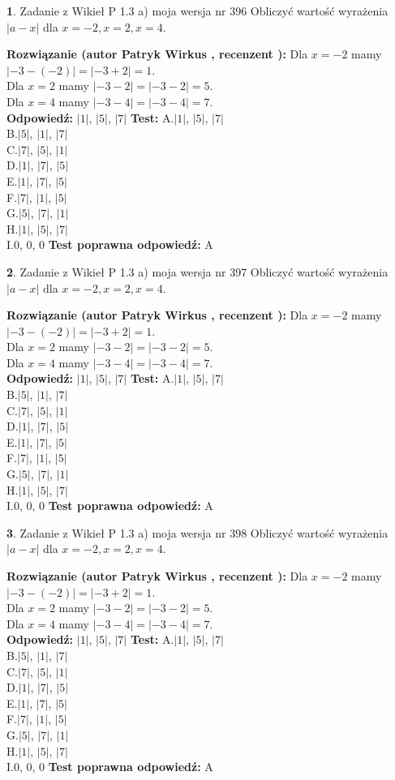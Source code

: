 \documentclass[12pt, a4paper]{article}
\theoremstyle{definition} %
\newtheorem{zad}{}
\newcommand{\zadStart}[1]{\begin{zad}#1\newline}
\newcommand{\zadStop}{\end{zad}}
\newcommand{\rozwStart}[2]{\noindent \textbf{Rozwiązanie (autor #1 , recenzent #2): }\newline}
\newcommand{\rozwStop}{\newline}
\newcommand{\odpStart}{\noindent \textbf{Odpowiedź:}\newline}
\newcommand{\odpStop}{\newline}
\newcommand{\testStart}{\noindent \textbf{Test:}\newline}
\newcommand{\testStop}{\newline}
\newcommand{\kluczStart}{\noindent \textbf{Test poprawna odpowiedź:}\newline}
\newcommand{\kluczStop}{\newline}
\begin{document}
\zadStart{Zadanie z Wikieł P 1.3 a) moja wersja nr 396}
Obliczyć wartość wyrażenia $|a - x|$ dla $x=-2,x=2,x=4$.
\zadStop
\rozwStart{Patryk Wirkus}{}
Dla $x = -2$ mamy $|-3 - (-2)| = |-3 + 2| = 1$.\\
Dla $x = 2$ mamy $|-3 - 2| = |-3 - 2| = 5$.\\
Dla $x = 4$ mamy $|-3 - 4| = |-3 - 4| = 7$.\\
\rozwStop
\odpStart
$|1|$, $|5|$, $|7|$
\odpStop
\testStart
A.$|1|$, $|5|$, $|7|$\\
B.$|5|$, $|1|$, $|7|$\\
C.$|7|$, $|5|$, $|1|$\\
D.$|1|$, $|7|$, $|5|$\\
E.$|1|$, $|7|$, $|5|$\\
F.$|7|$, $|1|$, $|5|$\\
G.$|5|$, $|7|$, $|1|$\\
H.$|1|$, $|5|$, $|7|$\\
I.$0$, $0$, $0$
\testStop
\kluczStart
A
\kluczStop



\zadStart{Zadanie z Wikieł P 1.3 a) moja wersja nr 397}
Obliczyć wartość wyrażenia $|a - x|$ dla $x=-2,x=2,x=4$.
\zadStop
\rozwStart{Patryk Wirkus}{}
Dla $x = -2$ mamy $|-3 - (-2)| = |-3 + 2| = 1$.\\
Dla $x = 2$ mamy $|-3 - 2| = |-3 - 2| = 5$.\\
Dla $x = 4$ mamy $|-3 - 4| = |-3 - 4| = 7$.\\
\rozwStop
\odpStart
$|1|$, $|5|$, $|7|$
\odpStop
\testStart
A.$|1|$, $|5|$, $|7|$\\
B.$|5|$, $|1|$, $|7|$\\
C.$|7|$, $|5|$, $|1|$\\
D.$|1|$, $|7|$, $|5|$\\
E.$|1|$, $|7|$, $|5|$\\
F.$|7|$, $|1|$, $|5|$\\
G.$|5|$, $|7|$, $|1|$\\
H.$|1|$, $|5|$, $|7|$\\
I.$0$, $0$, $0$
\testStop
\kluczStart
A
\kluczStop



\zadStart{Zadanie z Wikieł P 1.3 a) moja wersja nr 398}
Obliczyć wartość wyrażenia $|a - x|$ dla $x=-2,x=2,x=4$.
\zadStop
\rozwStart{Patryk Wirkus}{}
Dla $x = -2$ mamy $|-3 - (-2)| = |-3 + 2| = 1$.\\
Dla $x = 2$ mamy $|-3 - 2| = |-3 - 2| = 5$.\\
Dla $x = 4$ mamy $|-3 - 4| = |-3 - 4| = 7$.\\
\rozwStop
\odpStart
$|1|$, $|5|$, $|7|$
\odpStop
\testStart
A.$|1|$, $|5|$, $|7|$\\
B.$|5|$, $|1|$, $|7|$\\
C.$|7|$, $|5|$, $|1|$\\
D.$|1|$, $|7|$, $|5|$\\
E.$|1|$, $|7|$, $|5|$\\
F.$|7|$, $|1|$, $|5|$\\
G.$|5|$, $|7|$, $|1|$\\
H.$|1|$, $|5|$, $|7|$\\
I.$0$, $0$, $0$
\testStop
\kluczStart
A
\kluczStop
\end{document}
